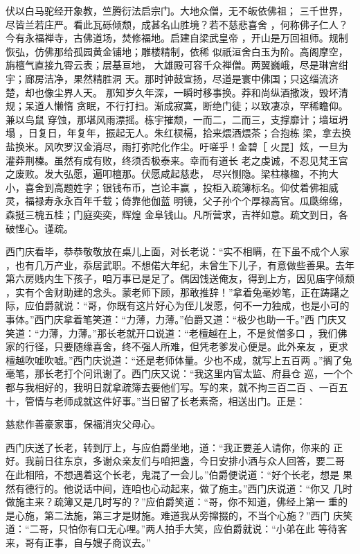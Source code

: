 伏以白马驼经开象教，竺腾衍法启宗门。大地众僧，无不皈依佛祖；
三千世界，尽皆兰若庄严。看此瓦砾倾颓，成甚名山胜境？若不慈悲喜舍
，何称佛子仁人？今有永福禅寺，古佛道场，焚修福地。启建自梁武皇帝
，开山是万回祖师。规制恢弘，仿佛那给孤园黄金铺地；雕楼精制，依稀
似祇洹舍白玉为阶。高阁摩空，旃檀气直接九霄云表；层基亘地，
大雄殿可容千众禅僧。两翼巍峨，尽是琳宫绀宇；廊房洁净，果然精胜洞
天。那时钟鼓宣扬，尽道是寰中佛国；只这缁流济楚，却也像尘界人天。
那知岁久年深，一瞬时移事换。莽和尚纵酒撒泼，毁坏清规；呆道人懒惰
贪眠，不行打扫。渐成寂寞，断绝门徒；以致凄凉，罕稀瞻仰。兼以鸟鼠
穿蚀，那堪风雨漂摇。栋宇摧颓，一而二，二而三，支撑靡计；墙垣坍塌
，日复日，年复年，振起无人。朱红棂槅，拾来煨酒煨茶；合抱栋
梁，拿去换盐换米。风吹罗汉金消尽，雨打弥陀化作尘。吁嗟乎！金碧［
火昆］炫，一旦为灌莽荆榛。虽然有成有败，终须否极泰来。幸而有道长
老之虔诚，不忍见梵王宫之废败。发大弘愿，遍叩檀那。伏愿咸起慈悲，
尽兴恻隐。梁柱椽楹，不拘大小，喜舍到高题姓字；银钱布币，岂论丰赢
，投柜入疏簿标名。仰仗着佛祖威灵，福禄寿永永百年千载；倚靠他伽蓝
明镜，父子孙个个厚禄高官。瓜瓞绵绵，森挺三槐五桂；门庭奕奕，辉煌
金阜钱山。凡所营求，吉祥如意。疏文到日，各破悭心。谨疏。

西门庆看毕，恭恭敬敬放在桌儿上面，对长老说：“实不相瞒，在下虽不成个人家
，也有几万产业，忝居武职。不想偌大年纪，未曾生下儿子，有意做些善果。去年
第六房贱内生下孩子，咱万事已是足了。偶因饯送俺友，得到上方，因见庙字倾颓
，实有个舍财助建的念头。蒙老师下顾，那敢推辞！”拿着兔毫妙笔，正在踌躇之
际，应伯爵就说：“哥，你既有这片好心为侄儿发愿，何不一力独成，也是小可的
事体。”西门庆拿着笔笑道：“力薄，力薄。”伯爵又道：“极少也助一千。”西
门庆又笑道：“力薄，力薄。”那长老就开口说道：“老檀越在上，不是贫僧多口
，我们佛家的行径，只要随缘喜舍，终不强人所难，但凭老爹发心便是。此外亲友
，更求檀越吹嘘吹嘘。”西门庆说道：“还是老师体量。少也不成，就写上五百两
。”搁了兔毫笔，那长老打个问讯谢了。西门庆又说：“我这里内官太监、府县仓
巡，一个个都与我相好的，我明日就拿疏簿去要他们写。写的来，就不拘三百二百
、一百五十，管情与老师成就这件好事。”当日留了长老素斋，相送出门。正是：

慈悲作善豪家事，保福消灾父母心。

西门庆送了长老，转到厅上，与应伯爵坐地，道：“我正要差人请你，你来的
正好。我前日往东京，多谢众亲友们与咱把盏，今日安排小酒与众人回答，要二哥
在此相陪，不想遇着这个长老，鬼混了一会儿。”伯爵便说道：“好个长老，想是
果然有德行的。他说话中间，连咱也心动起来，做了施主。”西门庆说道：“你又
几时做施主来？疏簿又是几时写的？”应伯爵笑道：“哥，你不知道，佛经上第一
重的是心施，第二法施，第三才是财施。难道我从旁撺掇的，不当个心施？”西门
庆笑道：“二哥，只怕你有口无心哩。”两人拍手大笑，应伯爵就说：“小弟在此
等待客来，哥有正事，自与嫂子商议去。”

